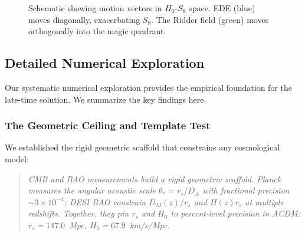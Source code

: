 \documentclass[twocolumn,showpacs,preprintnumbers,amsmath,amssymb,prd]{revtex4-2}
\begin{document}
\begin{figure}[h]
\centering
\caption{Schematic showing motion vectors in $H_0$-$S_8$ space. EDE (blue) moves diagonally, exacerbating $S_8$. The Ridder field (green) moves orthogonally into the magic quadrant.}
\label{fig:motion}
\end{figure}

\subsection{Detailed Numerical Exploration}

Our systematic numerical exploration provides the empirical foundation for the late-time solution. We summarize the key findings here.

\subsubsection{The Geometric Ceiling and Template Test}

We established the rigid geometric scaffold that constrains any cosmological model:

\begin{quote}
\textit{CMB and BAO measurements build a rigid geometric scaffold. Planck measures the angular acoustic scale $\theta_* = r_s/D_A$ with fractional precision $\sim 3 \times 10^{-4}$; DESI BAO constrain $D_M(z)/r_s$ and $H(z) r_s$ at multiple redshifts. Together, they pin $r_s$ and $H_0$ to percent-level precision in $\Lambda$CDM: $r_s = 147.0$~Mpc, $H_0 = 67.9$~km/s/Mpc.}
\end{quote}
\end{document}
